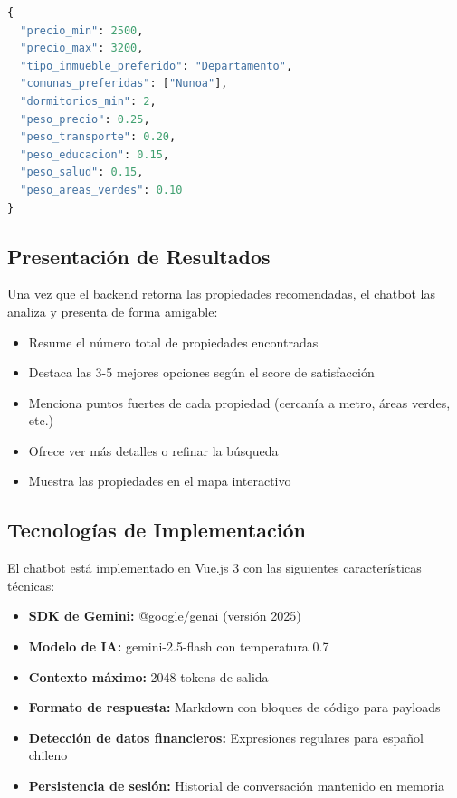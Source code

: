 \documentclass[11pt,letterpaper]{article}
\begin{document}
\begin{lstlisting}[language=Python, caption=Ejemplo de payload generado por el chatbot]
{
  "precio_min": 2500,
  "precio_max": 3200,
  "tipo_inmueble_preferido": "Departamento",
  "comunas_preferidas": ["Nunoa"],
  "dormitorios_min": 2,
  "peso_precio": 0.25,
  "peso_transporte": 0.20,
  "peso_educacion": 0.15,
  "peso_salud": 0.15,
  "peso_areas_verdes": 0.10
}
\end{lstlisting}

\subsection{Presentación de Resultados}

Una vez que el backend retorna las propiedades recomendadas, el chatbot las analiza y presenta de forma amigable:

\begin{itemize}
    \item Resume el número total de propiedades encontradas
    \item Destaca las 3-5 mejores opciones según el score de satisfacción
    \item Menciona puntos fuertes de cada propiedad (cercanía a metro, áreas verdes, etc.)
    \item Ofrece ver más detalles o refinar la búsqueda
    \item Muestra las propiedades en el mapa interactivo
\end{itemize}

\subsection{Tecnologías de Implementación}

El chatbot está implementado en Vue.js 3 con las siguientes características técnicas:

\begin{itemize}
    \item \textbf{SDK de Gemini:} @google/genai (versión 2025)
    \item \textbf{Modelo de IA:} gemini-2.5-flash con temperatura 0.7
    \item \textbf{Contexto máximo:} 2048 tokens de salida
    \item \textbf{Formato de respuesta:} Markdown con bloques de código para payloads
    \item \textbf{Detección de datos financieros:} Expresiones regulares para español chileno
    \item \textbf{Persistencia de sesión:} Historial de conversación mantenido en memoria
\end{itemize}
\end{document}
